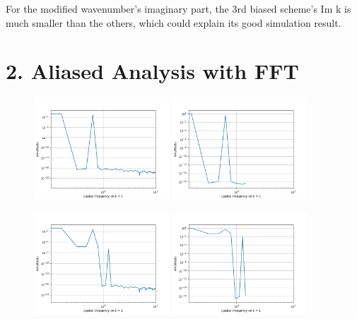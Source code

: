 \documentclass[12pt]{article}
\begin{document}
For the modified wavenumber's imaginary part, the 3rd biased scheme's Im k
is much smaller than the others, which could explain its good simulation 
result.





\section{2. Aliased Analysis with FFT}


\begin{figure}[H]
    \centering
    \includegraphics[width=0.45\textwidth]{figures/P2Fn1ub00.png}
    \includegraphics[width=0.45\textwidth]{figures/P2Fn1b00.png}
    \label{IGs.jpg}
\end{figure}


\begin{figure}[H]
    \centering
    \includegraphics[width=0.45\textwidth]{figures/P2Fn1ub01.png}
    \includegraphics[width=0.45\textwidth]{figures/P2Fn1b01.png}
    \label{IGs.jpg}
\end{figure}
\end{document}

